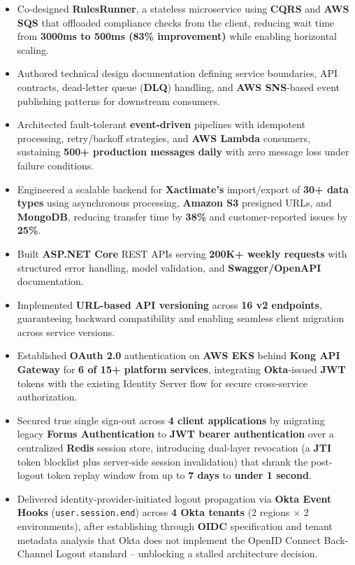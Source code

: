 \documentclass[a4paper,10pt]{article}
\begin{document}
\begin{itemize}[leftmargin=*]
    \item Co-designed \textbf{RulesRunner}, a stateless microservice using \textbf{CQRS} and \textbf{AWS SQS} that offloaded compliance checks from the client, reducing wait time from \textbf{3000ms to 500ms (83\% improvement)} while enabling horizontal scaling.
    \item Authored technical design documentation defining service boundaries, API contracts, dead-letter queue (\textbf{DLQ}) handling, and \textbf{AWS SNS}-based event publishing patterns for downstream consumers.
    \item Architected fault-tolerant \textbf{event-driven} pipelines with idempotent processing, retry/backoff strategies, and \textbf{AWS Lambda} consumers, sustaining \textbf{500+ production messages daily} with zero message loss under failure conditions.
    \item Engineered a scalable backend for \textbf{Xactimate's} import/export of \textbf{30+ data types} using asynchronous processing, \textbf{Amazon S3} presigned URLs, and \textbf{MongoDB}, reducing transfer time by \textbf{38\%} and customer-reported issues by \textbf{25\%}.
    \item Built \textbf{ASP.NET Core} REST APIs serving \textbf{200K+ weekly requests} with structured error handling, model validation, and \textbf{Swagger/OpenAPI} documentation.
    \item Implemented \textbf{URL-based API versioning} across \textbf{16 v2 endpoints}, guaranteeing backward compatibility and enabling seamless client migration across service versions.
    \item Established \textbf{OAuth 2.0} authentication on \textbf{AWS EKS} behind \textbf{Kong API Gateway} for \textbf{6 of 15+ platform services}, integrating \textbf{Okta}-issued \textbf{JWT} tokens with the existing Identity Server flow for secure cross-service authorization.
    \item Secured true single sign-out across \textbf{4 client applications} by migrating legacy \textbf{Forms Authentication} to \textbf{JWT bearer authentication} over a centralized \textbf{Redis} session store, introducing dual-layer revocation (a \textbf{JTI} token blocklist plus server-side session invalidation) that shrank the post-logout token replay window from up to \textbf{7 days} to \textbf{under 1 second}.
    \item Delivered identity-provider-initiated logout propagation via \textbf{Okta Event Hooks} (\texttt{user.session.end}) across \textbf{4 Okta tenants} (2 regions $\times$ 2 environments), after establishing through \textbf{OIDC} specification and tenant metadata analysis that Okta does not implement the OpenID Connect Back-Channel Logout standard -- unblocking a stalled architecture decision.

\end{itemize}
\end{document}
